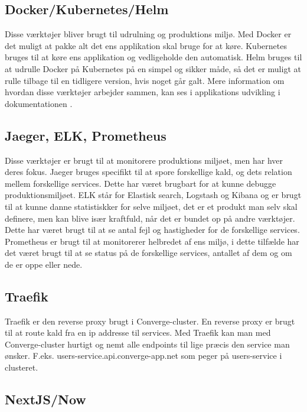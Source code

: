 \subsection{Docker/Kubernetes/Helm}

Disse værktøjer bliver brugt til udrulning og produktions miljø. Med Docker er det muligt at pakke alt det ens applikation skal bruge for at køre. Kubernetes bruges til at køre ens applikation og vedligeholde den automatisk. Helm bruges til at udrulle Docker på Kubernetes på en simpel og sikker måde, så det er muligt at rulle tilbage til en tidligere version, hvis noget går galt. Mere information om hvordan disse værktøjer arbejder sammen, kan ses i applikations udvikling i dokumentationen .

\subsection{Jaeger, ELK, Prometheus}

Disse værktøjer er brugt til at monitorere produktions miljøet, men har hver deres fokus. Jaeger bruges specifikt til at spore forskellige kald, og dets relation mellem forskellige services. Dette har været brugbart for at kunne debugge produktionsmiljøet. ELK står for Elastisk search, Logstash og Kibana og er brugt til at kunne danne statistiskker for selve miljøet, det er et produkt man selv skal definere, men kan blive især kraftfuld, når det er bundet op på andre værktøjer. Dette har været brugt til at se antal fejl og hastigheder for de forskellige services. Prometheus er brugt til at monitorerer helbredet af ens miljø, i dette tilfælde har det været brugt til at se status på de forskellige services, antallet af dem og om de er oppe eller nede.

\subsection{Traefik}

Traefik er den reverse proxy brugt i Converge-cluster. En reverse proxy er brugt til at route kald fra en ip addresse til services. Med Traefik kan man med Converge-cluster hurtigt og nemt alle endpoints til lige præcis den service man ønsker. F.eks. users-service.api.converge-app.net som peger på users-service i clusteret.

\subsection{NextJS/Now}

